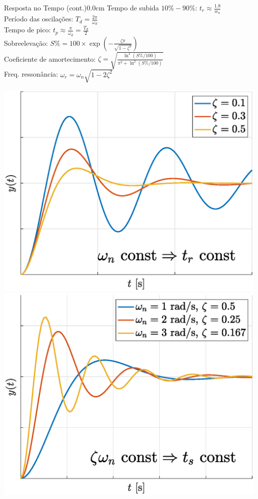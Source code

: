 \documentclass[portuguese,10pt,3col]{cheatsheet}
\begin{document}
\begin{multicols}{3}
\begin{cheatsheetbox}{Resposta no Tempo (cont.)}{0.0cm}
    Tempo de subida $10\% - 90\%$: $t_r \approx \frac{1.8}{w_n}$ \\
    Período das oscilações: $T_d = \frac{2\pi}{\omega_d}$ \\
    Tempo de pico: $t_p \approx \frac{\pi}{\omega_d} = \frac{T_d}{2}$ \\
    Sobreelevação: $S\% = 100 \times \exp\left(-\frac{\zeta \pi}{\sqrt{1 - \zeta^2}}\right)$ \\
    Coeficiente de amortecimento: $\zeta = \sqrt{\frac{\ln^2(S\%/100)}{\pi^2 + \ln^2(S\%/100)}}$ \\
    Freq. ressonância: $\omega_r = \omega_n \sqrt{1 - 2\zeta^2}$
    
    \hspace{-1.0 cm}
    
    \begin{minipage}{.16\textwidth}
        \centering
        \scalebox{0.5}{}
        \scalebox{0.5}{}
    \end{minipage}%
    \begin{minipage}{.35\textwidth}
        \centering
        \includegraphics[scale = 0.15]{figs/2.eps}
        \includegraphics[scale = 0.15]{figs/4.eps}

\end{minipage}
\end{cheatsheetbox}
\end{multicols}
\end{document}

